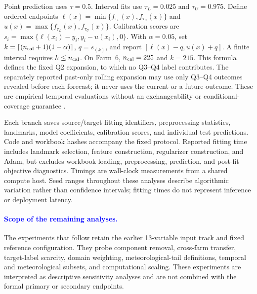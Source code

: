 {\color{blue}Point prediction uses $\tau=0.5$. Interval fits use $\tau_L=0.025$ and $\tau_U=0.975$. Define ordered endpoints $\ell(x)=\min\{f_{\tau_L}(x),f_{\tau_U}(x)\}$ and $u(x)=\max\{f_{\tau_L}(x),f_{\tau_U}(x)\}$. Calibration scores are $s_i=\max\{\ell(x_i)-y_i,y_i-u(x_i),0\}$. With $\alpha=0.05$, set $k=\lceil(n_{\rm cal}+1)(1-\alpha)\rceil$, $q=s_{(k)}$, and report $[\ell(x)-q,u(x)+q]$. A finite interval requires $k\le n_{\rm cal}$. On Farm~6, $n_{\rm cal}=225$ and $k=215$. This formula defines the fixed Q2 expansion, to which no Q3--Q4 label contributes. The separately reported past-only rolling expansion may use only Q3--Q4 outcomes revealed before each forecast; it never uses the current or a future outcome. These are empirical temporal evaluations without an exchangeability or conditional-coverage guarantee \citep{romano2019cqr}.}

{\color{blue}Each branch saves source/target fitting identifiers, preprocessing statistics, landmarks, model coefficients, calibration scores, and individual test predictions. Code and workbook hashes accompany the fixed protocol. Reported fitting time includes landmark selection, feature construction, regularizer construction, and Adam, but excludes workbook loading, preprocessing, prediction, and post-fit objective diagnostics. Timings are wall-clock measurements from a shared compute host. Seed ranges throughout these analyses describe algorithmic variation rather than confidence intervals; fitting times do not represent inference or deployment latency.}



\paragraph{\textcolor{blue}{Scope of the remaining analyses.}}
{\color{blue}The experiments that follow retain the earlier 13-variable input track and fixed reference configuration. They probe component removal, cross-farm transfer, target-label scarcity, domain weighting, meteorological-tail definitions, temporal and meteorological subsets, and computational scaling. These experiments are interpreted as descriptive sensitivity analyses and are not combined with the formal primary or secondary endpoints.}

